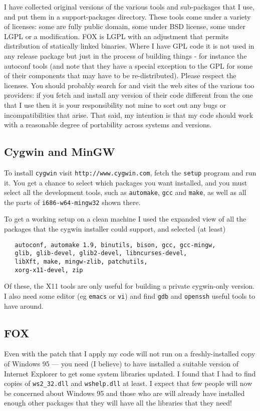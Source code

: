 \documentclass[11pt]{article}
\begin{document}
I have collected original versions of the various tools and
sub-packages that I use, and put them in a support-packages
directory. These tools come under a variety of licenses: some are
fully public domain, some under BSD license, some under LGPL or
a modification. FOX is LGPL with an adjustment that permits distribution
of statically linked binaries. Where I have GPL code it is not used
in any release package but just in the process of building things -
for instance the autoconf tools (and note that they have a special
exception to the GPL for some of their components that may have to
be re-distributed). Please respect the licenses. You should probably
search for and visit the web sites of the various too providers: if you
fetch and install any version of their code different from the one that
I use then it is your responsibility not mine to sort out any bugs or
incompatibilities that arise. That said, my intention is that my code
should work with a reasonable degree of portability across systems and
versions.

\subsection{Cygwin and MinGW}
To install \verb+cygwin+ visit \verb+http://www.cygwin.com+, fetch the
\verb+setup+ program and run it. You get a chance to select which packages
you want installed, and you must select all the development tools, such
as \verb+automake+, \verb+gcc+ and \verb+make+, as well as all the
parts of \verb+i686-w64-mingw32+ shown there.

To get a working setup on a clean machine I used the expanded view of all the
packages that the cygwin installer could support, and selected (at least)
\begin{verbatim}
   autoconf, automake 1.9, binutils, bison, gcc, gcc-mingw,
   glib, glib-devel, glib2-devel, libncurses-devel,
   libXft, make, mingw-zlib, patchutils,
   xorg-x11-devel, zip
\end{verbatim}
\noindent Of these, the X11 tools are only useful for building a
private cygwin-only version. I also need some editor (eg \verb.emacs.
or \verb.vi.) and find \verb.gdb. and \verb.openssh. useful tools
to have around.

\subsection{FOX}
Even with the patch that I apply my code will not run on
a freshly-installed copy of Windows 95 --- you need (I believe) to have
installed a suitable version of Internet Explorer to get some system
libraries updated. I found that I had to find copies of \verb+ws2_32.dll+
and \verb+wshelp.dll+ at least. I expect that few people will now be
concerned about Windows 95 and those who are will already have installed
enough other packages that they will have all the libraries that they need!
\end{document}

